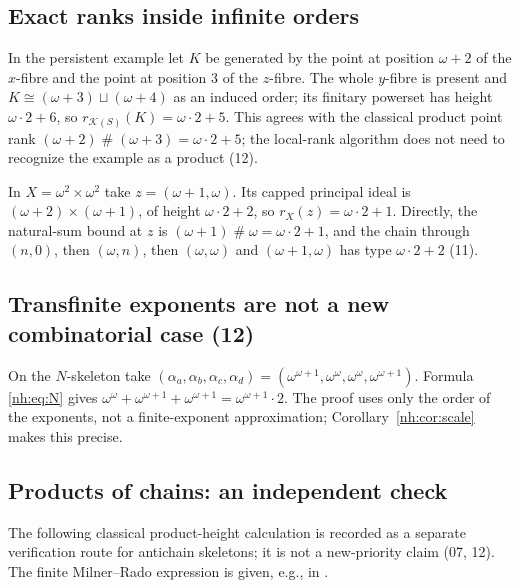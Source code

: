 \documentclass[11pt,a4paper]{article}
\theoremstyle{definition}
\theoremstyle{remark}
\newcommand{\K}{\mathcal K}
\newcommand{\ns}{\mathbin{\#}}
\begin{document}
\subsection{Exact ranks inside infinite orders}

In the persistent example let $K$ be generated by the point at position
$\omega+2$ of the $x$-fibre and the point at position $3$ of the $z$-fibre. The
whole $y$-fibre is present and $K\cong(\omega+3)\sqcup(\omega+4)$ as an induced
order; its finitary powerset has height $\omega\cdot2+6$, so
$r_{\K(S)}(K)=\omega\cdot2+5$. This agrees with the classical product point
rank $(\omega+2)\ns(\omega+3)=\omega\cdot2+5$; the local-rank algorithm does not
need to recognize the example as a product (12).

In $X=\omega^2\times\omega^2$ take $z=(\omega+1,\omega)$. Its capped principal
ideal is $(\omega+2)\times(\omega+1)$, of height $\omega\cdot2+2$, so
$r_X(z)=\omega\cdot2+1$. Directly, the natural-sum bound at $z$ is
$(\omega+1)\ns\omega=\omega\cdot2+1$, and the chain through $(n,0)$, then
$(\omega,n)$, then $(\omega,\omega)$ and $(\omega+1,\omega)$ has type
$\omega\cdot2+2$ (11).

\subsection{Transfinite exponents are not a new combinatorial case (12)}

On the $N$-skeleton take
$(\alpha_a,\alpha_b,\alpha_c,\alpha_d)=(\omega^{\omega+1},\omega^\omega,\omega^\omega,\omega^{\omega+1})$.
Formula \eqref{nh:eq:N} gives $\omega^\omega+\omega^{\omega+1}+\omega^{\omega+1}=
\omega^{\omega+1}\cdot2$. The proof uses only the order of the exponents, not a
finite-exponent approximation; Corollary~\ref{nh:cor:scale} makes this precise.

\subsection{Products of chains: an independent check}

The following classical product-height calculation is recorded as a separate
verification route for antichain skeletons; it is not a new-priority claim
(07, 12). The finite Milner--Rado expression is given, e.g., in
\cite[Theorem~2.20]{Hilton2016}.
\end{document}
